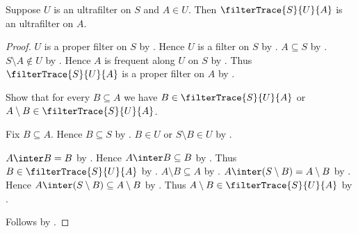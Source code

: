 \begin{theorem}\label{filter_trace_of_ultrafilter_to_member}
    Suppose $U$ is an ultrafilter on $S$ and $A\in U$.
    Then $\filterTrace{S}{U}{A}$ is an ultrafilter on $A$.
\end{theorem}
\begin{proof}
    $U$ is a proper filter on $S$ by
        .
    Hence $U$ is a filter on $S$ by .
    $A\subseteq S$ by .
    $S\setminus A\notin U$ by .
    Hence $A$ is frequent along $U$ on $S$ by
        .
    Thus $\filterTrace{S}{U}{A}$ is a proper filter on $A$ by
        .

    Show that for every $B\subseteq A$ we have
        $B\in\filterTrace{S}{U}{A}$ or
        $A\setminus B\in\filterTrace{S}{U}{A}$.
    \begin{subproof}
        Fix $B\subseteq A$.
        Hence $B\subseteq S$ by .
        $B\in U$ or $S\setminus B\in U$ by
            .
        \begin{byCase}
            $A\inter B=B$ by
                .
            Hence $A\inter B\subseteq B$ by .
            Thus $B\in\filterTrace{S}{U}{A}$ by
                .
            $A\setminus B\subseteq A$ by .
            $A\inter(S\setminus B)=A\setminus B$ by
                .
            Hence $A\inter(S\setminus B)\subseteq A\setminus B$ by
                .
            Thus $A\setminus B\in\filterTrace{S}{U}{A}$ by
                .
        \end{byCase}
    \end{subproof}
    Follows by .
\end{proof}


